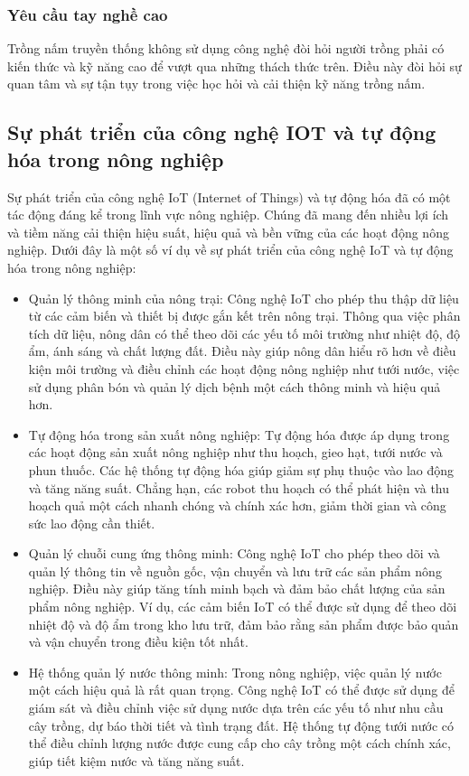 \subsubsection{Yêu cầu tay nghề cao}
Trồng nấm truyền thống không sử dụng công nghệ đòi hỏi người trồng phải có kiến thức và kỹ năng cao để vượt qua những thách thức trên. Điều này đòi hỏi sự quan tâm và sự tận tụy trong việc học hỏi và cải thiện kỹ năng trồng nấm.

\subsection{Sự phát triển của công nghệ IOT và tự động hóa trong nông nghiệp}

Sự phát triển của công nghệ IoT (Internet of Things) và tự động hóa đã có một tác động đáng kể trong lĩnh vực nông nghiệp. Chúng đã mang đến nhiều lợi ích và tiềm năng cải thiện hiệu suất, hiệu quả và bền vững của các hoạt động nông nghiệp. Dưới đây là một số ví dụ về sự phát triển của công nghệ IoT và tự động hóa trong nông nghiệp:

\begin{itemize}
    \item Quản lý thông minh của nông trại: Công nghệ IoT cho phép thu thập dữ liệu từ các cảm biến và thiết bị được gắn kết trên nông trại. Thông qua việc phân tích dữ liệu, nông dân có thể theo dõi các yếu tố môi trường như nhiệt độ, độ ẩm, ánh sáng và chất lượng đất. Điều này giúp nông dân hiểu rõ hơn về điều kiện môi trường và điều chỉnh các hoạt động nông nghiệp như tưới nước, việc sử dụng phân bón và quản lý dịch bệnh một cách thông minh và hiệu quả hơn.
    \item Tự động hóa trong sản xuất nông nghiệp: Tự động hóa được áp dụng trong các hoạt động sản xuất nông nghiệp như thu hoạch, gieo hạt, tưới nước và phun thuốc. Các hệ thống tự động hóa giúp giảm sự phụ thuộc vào lao động và tăng năng suất. Chẳng hạn, các robot thu hoạch có thể phát hiện và thu hoạch quả một cách nhanh chóng và chính xác hơn, giảm thời gian và công sức lao động cần thiết.
    \item Quản lý chuỗi cung ứng thông minh: Công nghệ IoT cho phép theo dõi và quản lý thông tin về nguồn gốc, vận chuyển và lưu trữ các sản phẩm nông nghiệp. Điều này giúp tăng tính minh bạch và đảm bảo chất lượng của sản phẩm nông nghiệp. Ví dụ, các cảm biến IoT có thể được sử dụng để theo dõi nhiệt độ và độ ẩm trong kho lưu trữ, đảm bảo rằng sản phẩm được bảo quản và vận chuyển trong điều kiện tốt nhất.
    \item Hệ thống quản lý nước thông minh: Trong nông nghiệp, việc quản lý nước một cách hiệu quả là rất quan trọng. Công nghệ IoT có thể được sử dụng để giám sát và điều chỉnh việc sử dụng nước dựa trên các yếu tố như nhu cầu cây trồng, dự báo thời tiết và tình trạng đất. Hệ thống tự động tưới nước có thể điều chỉnh lượng nước được cung cấp cho cây trồng một cách chính xác, giúp tiết kiệm nước và tăng năng suất.
\end{itemize}

